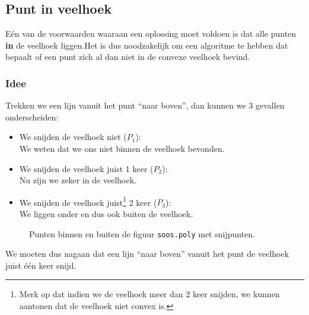 \subsection{Punt in veelhoek}
\label{sub:algo-pt-in-poly}
Eén van de voorwaarden waaraan een oplossing moet voldoen is dat alle punten \textbf{in} de veelhoek liggen.Het is dus noodzakelijk om een algoritme te hebben dat bepaalt of een punt zich al dan niet in de convexe veelhoek bevind.
\subsubsection{Idee}
Trekken we een lijn vanuit het punt ``naar boven'', dan kunnen we 3 gevallen onderscheiden:
\begin{itemize}
\item We snijden de veelhoek niet ($P_{1}$): \\
		We weten dat we ons niet binnen de veelhoek bevonden.
\item We snijden de veelhoek juist 1 keer ($P_{2}$):\\
		Nu zijn we zeker in de veelhoek. 
\item We snijden de veelhoek juist\footnote{Merk op dat indien we de veelhoek meer dan 2 keer snijden, we kunnen aantonen dat de veelhoek niet convex is.} 2 keer ($P_{3}$):\\
		We liggen onder en dus ook buiten de veelhoek.
\end{itemize}

\begin{center}
\begin{figure}[H]
\centering
{}
\caption{Punten binnen en buiten de figuur \texttt{soos.poly} met snijpunten.}
\end{figure}
\end{center}
We moeten dus nagaan dat een lijn ``naar boven'' vanuit het punt de veelhoek
juist één keer snijd.


